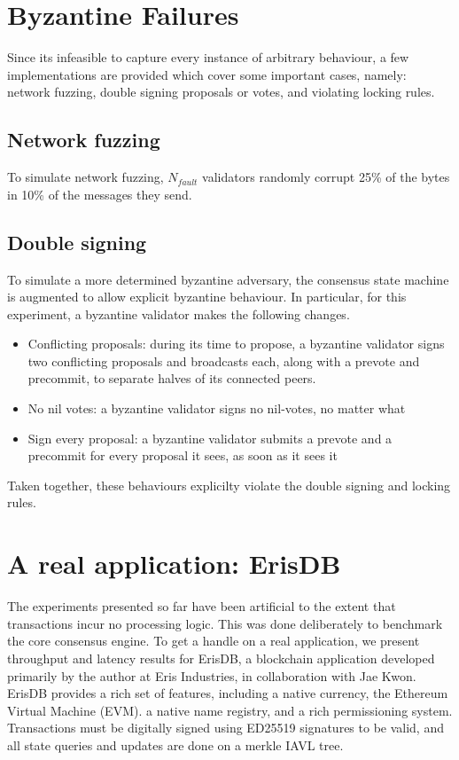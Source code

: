 \section{Byzantine Failures}

Since its infeasible to capture every instance of arbitrary behaviour,
a few implementations are provided which cover some important cases, namely:
network fuzzing, double signing proposals or votes, and violating locking rules.

\subsection{Network fuzzing}

To simulate network fuzzing, $N_{fault}$ validators randomly corrupt 25\% of the bytes in 10\% of the messages they send.

\subsection{Double signing}

To simulate a more determined byzantine adversary, the consensus state machine is augmented to allow explicit byzantine behaviour.
In particular, for this experiment, a byzantine validator makes the following changes.

\begin{itemize}
\item{Conflicting proposals: during its time to propose, a byzantine validator signs two conflicting proposals and broadcasts each, along with a prevote and precommit, to separate halves of its connected peers.} 
\item{No nil votes: a byzantine validator signs no nil-votes, no matter what}
\item{Sign every proposal: a byzantine validator submits a prevote and a precommit for every proposal it sees, as soon as it sees it}
\end{itemize}

Taken together, these behaviours explicilty violate the double signing and locking rules. 

\section{A real application: ErisDB}

The experiments presented so far have been artificial to the extent that transactions incur no processing logic.
This was done deliberately to benchmark the core consensus engine. 
To get a handle on a real application, we present throughput and latency results for ErisDB, 
a blockchain application developed primarily by the author at Eris Industries, in collaboration with Jae Kwon.
ErisDB provides a rich set of features, including a native currency, the Ethereum Virtual Machine (EVM).
a native name registry, and a rich permissioning system.
Transactions must be digitally signed using ED25519 signatures to be valid, and all state queries and updates are done on a merkle IAVL tree.

